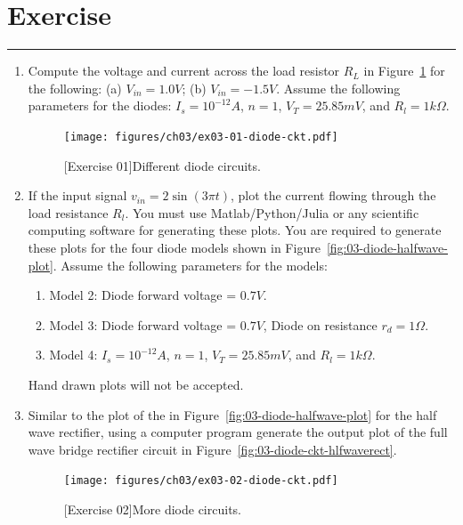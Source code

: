 \section{Exercise}
\vspace{-0.5cm}
\begin{center}
    \rule{\textwidth}{1pt}
\end{center}

\begin{enumerate}
    \item Compute the voltage and current across the load resistor $R_L$ in Figure~\ref{fig:ex03-01} for the following: (a) $V_{in} = 1.0V$; (b) $V_{in} = -1.5V$. Assume the following parameters for the diodes: $I_s = 10^{-12}A$, $n = 1$, $V_T = 25.85mV$, and $R_l = 1k\Omega$.
    \begin{figure}[htbp]
        \centering
        \texttt{[image: figures/ch03/ex03-01-diode-ckt.pdf]}
        \caption{[Exercise 01]Different diode circuits.}
        \label{fig:ex03-01}
    \end{figure}

    \item If the input signal $v_{in} = 2\sin\left(3\pi t\right)$, plot the current flowing through the load resistance $R_l$. You must use Matlab/Python/Julia or any scientific computing software for generating these plots. You are required to generate these plots for the four diode models shown in Figure~\ref{fig:03-diode-halfwave-plot}. Assume the following parameters for the models:
    \begin{enumerate}
        \item Model 2: Diode forward voltage = $0.7V$.
        \item Model 3: Diode forward voltage = $0.7V$, Diode on resistance $r_d = 1\Omega$.
        \item Model 4: $I_s = 10^{-12}A$, $n = 1$, $V_T = 25.85mV$, and $R_l = 1k\Omega$.
    \end{enumerate} 
    Hand drawn plots will not be accepted.

    \item Similar to the plot of the in Figure~\ref{fig:03-diode-halfwave-plot} for the half wave rectifier, using a computer program generate the output plot of the full wave bridge rectifier circuit in Figure~\ref{fig:03-diode-ckt-hlfwaverect}.
    
    \begin{figure}[htbp]
        \centering
        \texttt{[image: figures/ch03/ex03-02-diode-ckt.pdf]}
        \caption{[Exercise 02]More diode circuits.}
        \label{fig:ex03-02}
    \end{figure}
    

\end{enumerate}
